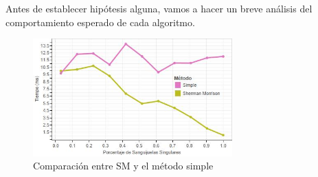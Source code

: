 Antes de establecer hipótesis alguna, vamos a hacer un breve análisis del comportamiento esperado de cada algoritmo. 

\begin{figure}[H]
    \centering
    \includegraphics[width=0.685\textwidth]{experimento 3-1}
    \caption{Comparación entre SM y el método simple}
    \label{fig:exp31}
\end{figure}
